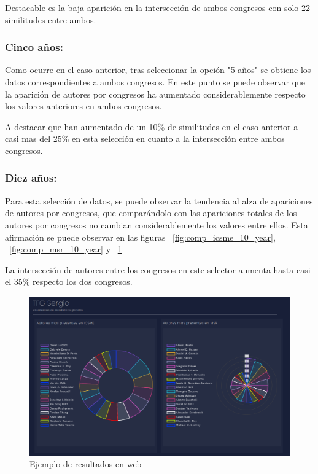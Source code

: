 \documentclass[a4paper, 12pt]{book}
\begin{document}
Destacable es la baja aparición en la intersección de ambos congresos con solo 22 similitudes entre ambos.


\subsubsection{Cinco años:}
Como ocurre en el caso anterior, tras seleccionar la opción "5 años" se obtiene los datos correspondientes a ambos congresos. En este punto se puede observar que la aparición de autores por congresos ha aumentado considerablemente respecto los valores anteriores en ambos congresos.

A destacar que han aumentado de un 10\% de similitudes en el caso anterior a casi mas del 25\% en esta selección en cuanto a la intersección entre ambos congresos.


\subsubsection{Diez años:}
Para esta selección de datos, se puede observar la tendencia al alza de apariciones de autores por congresos, que comparándolo con las apariciones totales de los autores por congresos no cambian considerablemente los valores entre ellos. Esta afirmación se puede observar en las figuras ~\ref{fig:comp_icsme_10_year}, ~\ref{fig:comp_msr_10_year} y ~\ref{fig:res_web}

La intersección de autores entre los congresos en este selector aumenta hasta casi el 35\% respecto los dos congresos.

\begin{figure}[h]
  \centering
  \includegraphics[width=16cm, keepaspectratio]{img/res_web.png}
  \caption{Ejemplo de resultados en web}
  \label{fig:res_web}
\end{figure}
\end{document}
